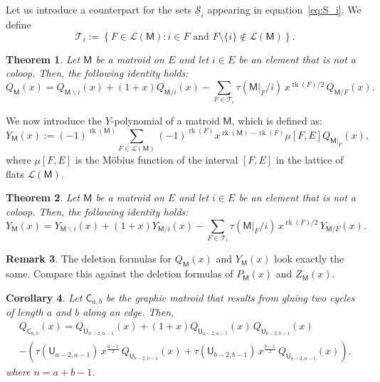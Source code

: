 \documentclass[11pt, a4paper, english]{amsart}
\theoremstyle{teoremas}
\newtheorem{theorem}{Theorem}[section]
\newtheorem{corollary}[theorem]{Corollary}
\theoremstyle{definition}
\newtheorem{remark}[theorem]{Remark}
\DeclareMathOperator{\rk}{rk}
\newcommand{\M}{\mathsf{M}}
\newcommand{\U}{\mathsf{U}}
\begin{document}
Let us introduce a counterpart for the sets $\underline{\mathscr{S}}_i$ appearing in equation~\eqref{eq:S_i}. We define
\begin{equation}\label{eq:T_i}
    \mathscr{T}_i := \left\{ F \in \mathcal{L}(\M): i\in F \text{ and } F\setminus\{i\}\notin \mathcal{L}(\M)\right\}.
\end{equation}


\begin{theorem}\label{thm:deletion_formula_Q}
    Let $\M$ be a matroid on $E$ and let $i\in E$ be an element that is not a coloop. Then, the following identity holds:
    \[ Q_{\M}(x) = Q_{\M\smallsetminus i}(x) + (1+x) Q_{\M/i}(x) - \sum_{F\in \mathcal{T}_i} \tau(\M|_F/i)\, x^{\rk(F)/2}\, Q_{\M/F}(x).\]
\end{theorem}

We now introduce the $Y$-polynomial of a matroid $\M$, which is defined as:
\begin{equation}\label{eq:Y_polynomial}
    Y_{\M}(x) := (-1)^{\rk(\M)}\sum_{F\in \mathcal{L}(\M)} (-1)^{\rk(F)} x^{\rk(\M) - \rk(F)} \mu[F,E] Q_{\M|_F}(x),
\end{equation}
where $\mu[F,E]$ is the Möbius function of the interval $[F,E]$ in the lattice of flats $\mathcal{L}(\M)$.

\begin{theorem}
    Let $\M$ be a matroid on $E$ and let $i\in E$ be an element that is not a coloop. Then, the following identity holds:
    \[ Y_{\M}(x) = Y_{\M\smallsetminus i}(x) + (1+x) Y_{\M/i}(x) - \sum_{F\in \mathcal{T}_i} \tau(\M|_F/i)\, x^{\rk(F)/2}\, Y_{\M/F}(x).\]
\end{theorem}

\begin{remark}
    The deletion formulas for $Q_{\M}(x)$ and $Y_{\M}(x)$ look exactly the same. Compare this against the deletion formulas of $P_{\M}(x)$ and $Z_{\M}(x)$.
\end{remark}



\begin{corollary}
    Let $\mathsf{C}_{a,b}$ be the graphic matroid that results from gluing two cycles of length $a$ and $b$ along an edge. Then,
    \begin{multline*} Q_{\mathsf{C}_{a,b}}(x) = Q_{\U_{n-2,n-1}}(x)  + (1+x) Q_{\U_{a-2,a-1}}(x)\, Q_{\U_{b-2,b-1}}(x) \\- \left(\tau(\U_{a-2,a-1})\, x^{\frac{a-1}{2}}\, Q_{\U_{b-2,b-1}}(x) + \tau(\U_{b-2,b-1})\, x^{\frac{b-1}{2}} \,Q_{\U_{a-2,a-1}}(x)\right).
    \end{multline*}
    where $n = a+b-1$.
\end{corollary}
\end{document}
